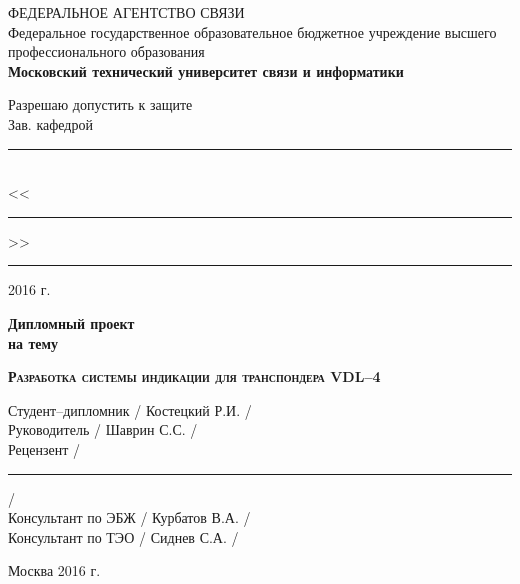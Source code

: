 \begin{titlepage}
  \newpage

  \begin{center}
    ФЕДЕРАЛЬНОЕ АГЕНТСТВО СВЯЗИ \\
    \vspace{1cm}
    Федеральное государственное образовательное бюджетное учреждение высшего
    профессионального образования\\
    \textbf{Московский технический университет связи и информатики}
  \end{center}

  \vspace{1.5em}

  \hspace{-1cm}\begin{minipage}{0.35\textwidth}
    \begin{center}
      Разрешаю допустить к защите \\
      Зав. кафедрой \\
    \end{center}
    \vspace{-1.0em}
    \rule{\textwidth}{.1pt} \\
    <<\rule{2em}{.1pt}>> \rule{6em}{.1pt} 2016 г.
  \end{minipage}
  \vfill

  \begin{center}
    \Huge\bfseries Дипломный проект \\ на тему
  \end{center}

  \vspace{0.5em}

  \begin{center}
    \textsc{\textbf{\Large Разработка системы индикации для транспондера VDL--4}}
  \end{center}

  \vfill

  \begin{flushleft}
    Студент--дипломник \hrulefill / Костецкий Р.И. / \\
    \vspace{1.5em}
    Руководитель \hrulefill / Шаврин С.С. /\\
    \vspace{1.5em}
    Рецензент \hrulefill  / \rule{6em}{.1pt} /\\
    \vspace{1.5em}
    Консультант по ЭБЖ \hrulefill / Курбатов В.А. /\\
    \vspace{1.5em}
    Консультант по ТЭО \hrulefill / Сиднев С.А. /\\
    \vspace{1.5em}
  \end{flushleft}

  \vspace{\fill}

  \begin{center}
    Москва 2016 г.
  \end{center}

\end{titlepage}